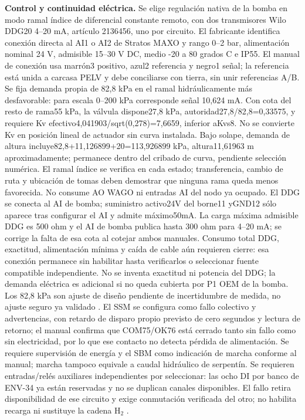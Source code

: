 \textbf{Control y continuidad eléctrica.} Se elige regulación nativa de la bomba en modo ramal índice de diferencial constante remoto, con dos transmisores Wilo DDG20 4--20 mA, artículo 2136456, uno por circuito. El fabricante identifica conexión directa al AI1 o AI2 de Stratos MAXO y rango 0--2 bar, alimentación nominal 24 V, admisible 15--30 V DC, medio -20 a 80 grados C e IP55. El manual de conexión usa marrón3 positivo, azul2 referencia y negro1 señal; la referencia está unida a carcasa PELV y debe conciliarse con tierra, sin unir referencias A/B. Se fija demanda propia de 82,8 kPa en el ramal hidráulicamente más desfavorable: para escala 0--200 kPa corresponde señal 10,624 mA. Con cota del resto de rama55 kPa, la válvula dispone27,8 kPa, autoridad27,8/82,8=0,33575, y requiere Kv efectivo4,041903/sqrt(0,278)=7,6659, inferior aKvs8. No se convierte Kv en posición lineal de actuador sin curva instalada. Bajo solape, demanda de altura incluye82,8+11,126899+20=113,926899 kPa, altura11,61963 m aproximadamente; permanece dentro del cribado de curva, pendiente selección numérica. El ramal índice se verifica en cada estado; transferencia, cambio de ruta y ubicación de tomas deben demostrar que ninguna rama queda menos favorecida. No consume AO WAGO ni entradas AI del nodo ya ocupado. El DDG se conecta al AI de bomba; suministro activo24V del borne11 yGND12 sólo aparece tras configurar el AI y admite máximo50mA. La carga máxima admisible DDG es 500 ohm y el AI de bomba publica hasta 300 ohm para 4--20 mA; se corrige la falta de esa cota al cotejar ambos manuales. Consumo total DDG, exactitud, alimentación mínima y caída de cable aún requieren cierre: esa conexión permanece sin habilitar hasta verificarlos o seleccionar fuente compatible independiente. No se inventa exactitud ni potencia del DDG; la demanda eléctrica es adicional si no queda cubierta por P1 OEM de la bomba. Los 82,8 kPa son ajuste de diseño pendiente de incertidumbre de medida, no ajuste seguro ya validado \parencite{lote37-ddg-producto}\parencite[pp.~19--20, 23--24]{lote37-ddg-manual}\parencite[p.~36]{lote37-wilo-instalacion}. El SSM se configura como fallo colectivo y advertencias, con retardo de disparo propio previsto de cero segundos y lectura de retorno; el manual confirma que COM75/OK76 está cerrado tanto sin fallo como sin electricidad, por lo que ese contacto no detecta pérdida de alimentación. Se requiere supervisión de energía y el SBM como indicación de marcha conforme al manual; marcha tampoco equivale a caudal hidráulico de serpentín. Se requieren entradas/relés auxiliares independientes por seleccionar: las ocho DI por banco de ENV-34 ya están reservadas y no se duplican canales disponibles. El fallo retira disponibilidad de ese circuito y exige conmutación verificada del otro; no habilita recarga ni sustituye la cadena H$_2$ \parencite[pp.~18, 58--59]{lote37-wilo-usuario}.

